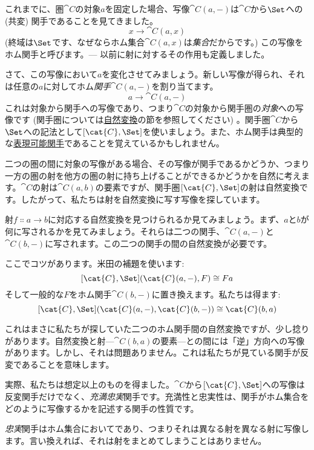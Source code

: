 
\lettrine[lhang=0.17]{こ}{れまで}に、圏$\cat{C}$の対象$a$を固定した場合、写像$\cat{C}(a, -)$は$\cat{C}$から$\Set$への (共変) 関手であることを見てきました。
\[x \to \cat{C}(a, x)\]
 (終域は$\Set$です、なぜならホム集合$\cat{C}(a, x)$は\emph{集合}だからです。) この写像をホム関手と呼びます。--- 以前に射に対するその作用も定義しました。

さて、この写像において$a$を変化させてみましょう。新しい写像が得られ、それは任意の$a$に対してホム\emph{関手}$\cat{C}(a, -)$を割り当てます。
\[a \to \cat{C}(a, -)\]
これは対象から関手への写像であり、つまり$\cat{C}$の対象から関手圏の\emph{対象}への写像です (関手圏については\hyperref[natural-transformations]{自然変換}の節を参照してください) 。関手圏$\cat{C}$から$\Set$への記法として$[\cat{C}, \Set]$を使いましょう。また、ホム関手は典型的な\hyperref[representable-functors]{表現可能関手}であることを覚えているかもしれません。

二つの圏の間に対象の写像がある場合、その写像が関手であるかどうか、つまり一方の圏の射を他方の圏の射に持ち上げることができるかどうかを自然に考えます。$\cat{C}$の射は$\cat{C}(a, b)$の要素ですが、関手圏$[\cat{C}, \Set]$の射は自然変換です。したがって、私たちは射を自然変換に写す写像を探しています。

射$f \Colon a \to b$に対応する自然変換を見つけられるか見てみましょう。まず、$a$と$b$が何に写されるかを見てみましょう。それらは二つの関手、$\cat{C}(a, -)$と$\cat{C}(b, -)$に写されます。この二つの関手の間の自然変換が必要です。

ここでコツがあります。米田の補題を使います: 
\[[\cat{C}, \Set](\cat{C}(a, -), F) \cong F a\]
そして一般的な$F$をホム関手$\cat{C}(b, -)$に置き換えます。私たちは得ます: 
\[[\cat{C}, \Set](\cat{C}(a, -), \cat{C}(b, -)) \cong \cat{C}(b, a)\]

\noindent
これはまさに私たちが探していた二つのホム関手間の自然変換ですが、少し捻りがあります。自然変換と射---$\cat{C}(b, a)$の要素---との間には「逆」方向への写像があります。しかし、それは問題ありません。これは私たちが見ている関手が反変であることを意味します。

\noindent
実際、私たちは想定以上のものを得ました。$\cat{C}$から$[\cat{C}, \Set]$への写像は反変関手だけでなく、\emph{充満忠実}関手です。充満性と忠実性は、関手がホム集合をどのように写像するかを記述する関手の性質です。

\emph{忠実}関手はホム集合においてであり、つまりそれは異なる射を異なる射に写像します。言い換えれば、それは射をまとめてしまうことはありません。

